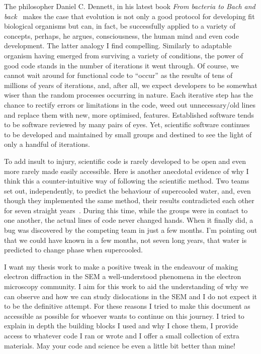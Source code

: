 The philosopher Daniel C. Dennett, in his latest book \textit{From bacteria to Bach and back}~\cite{Dennett} makes the case that evolution is not only a good protocol for developing fit biological organisms but can, in fact, be successfully applied to a variety of concepts, perhaps, he argues, consciousness, the human mind and even code development. The latter analogy I find compelling. Similarly to adaptable organism having emerged from surviving a variety of conditions, the power of good code stands in the number of iterations it went through. Of course, we cannot wait around for functional code to ``occur'' as the results of tens of millions of years of iterations, and, after all, we expect developers to be somewhat wiser than the random processes occurring in nature. Each iterative step has the chance to rectify errors or limitations in the code, weed out unnecessary/old lines and replace them with new, more optimised, features. Established software tends to be software reviewed by many pairs of eyes. Yet, scientific software continues to be developed and  maintained by small groups and destined to see the light of only a handful of iterations.  


To add insult to injury, scientific code is rarely developed to be open and even more rarely made easily accessible. Here is another anecdotal evidence of why I think this a counter-intuitive way of following the scientific method. Two teams set out, independently, to predict the behaviour of supercooled water, and, even though they implemented the same method, their results contradicted each other for seven straight years~\cite{supercool}. During this time, while the groups were in contact to one another, the actual lines of code never changed hands. When it finally did, a bug was discovered by the competing team in just a few months. I'm pointing out that we could have known in a few months, not seven long years, that water is predicted to change phase when supercooled. 


I want my thesis work to make a positive tweak in the endeavour of making electron diffraction in the SEM a well-understood phenomena in the electron microscopy community. I aim for this work to aid the understanding of why we can observe and how we can study dislocations in the SEM and I do not expect it to be the definitive attempt. For these reasons I tried to make this document as accessible as possible for whoever wants to continue on this journey. I tried to explain in depth the building blocks I used and why I chose them, I provide access to whatever code I ran or wrote and I offer a small collection of extra materials. May your code and science be even a little bit better than mine!



